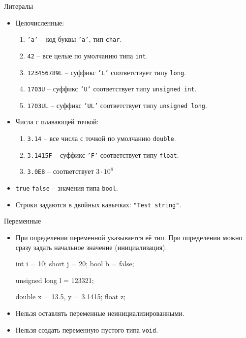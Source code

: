 \documentclass[9pt]{beamer}
\begin{document}
\begin{frame}{Литералы}
    \begin{itemize}
        \item Целочисленные:
        \begin{enumerate}
            \item \texttt{'a'} -- код буквы \texttt{'a'}, тип \texttt{char}.
            \item \texttt{42} -- все целые по умолчанию типа \texttt{int}.
            \item \texttt{123456789L} -- суффикс \texttt{'L'} соответствует типу \texttt{long}.
            \item \texttt{1703U} -- суффикс \texttt{'U'} соответствует типу \texttt{unsigned int}.
            \item \texttt{1703UL} -- суффикс \texttt{'UL'} соответствует типу \texttt{unsigned long}.
        \end{enumerate}
        \item Числа с плавающей точкой:
        \begin{enumerate}
            \item \texttt{3.14} -- все числа с точкой по умолчанию \texttt{double}.
            \item \texttt{3.1415F} -- суффикс \texttt{'F'} соответствует типу \texttt{float}.
            \item \texttt{3.0E8} -- соответствует  $ 3\cdot10^8 $
        \end{enumerate}
        \item \texttt{true} \texttt{false} -- значения типа \texttt{bool}.
        \item Строки задаются в двойных кавычках: \texttt{"Test string"}.
    \end{itemize}
\end{frame}

\begin{frame}[fragile]{Переменные}
    \begin{itemize}
        \item При определении переменной указывается её тип. При определении можно сразу задать начальное значение (инициализация).
        \begin{cppcode}
            int i = 10;
            short j = 20;
            bool b = false;
            
            unsigned long l = 123321;
            
            double x = 13.5, y = 3.1415;
            float z;
        \end{cppcode}
    \item Нельзя оставлять переменные неинициализированными.
    \item Нельзя создать переменную пустого типа \texttt{void}.
    \end{itemize}
\end{frame}
\end{document}
